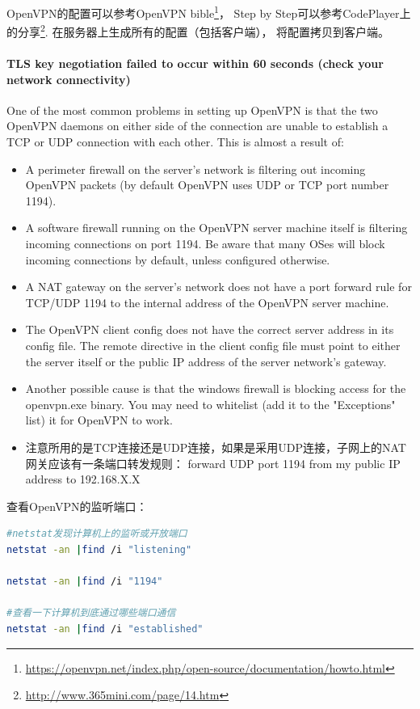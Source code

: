 \documentclass{book}
\begin{document}
OpenVPN的配置可以参考OpenVPN bible\footnote{\url{https://openvpn.net/index.php/open-source/documentation/howto.html}}，
Step by Step可以参考CodePlayer上的分享\footnote{\url{http://www.365mini.com/page/14.htm}}.
在服务器上生成所有的配置（包括客户端），
将配置拷贝到客户端。


\paragraph{TLS key negotiation failed to occur within 60 seconds (check your network connectivity)}

One of the most common problems in setting up OpenVPN is that the two OpenVPN daemons on either side of the connection are unable to establish a TCP or UDP connection with each other.
This is almost a result of:

\begin{itemize}
\item{A perimeter firewall on the server's network is filtering out incoming OpenVPN packets (by default OpenVPN uses UDP or TCP port number 1194).}
\item{A software firewall running on the OpenVPN server machine itself is filtering incoming connections on port 1194. Be aware that many OSes will block incoming connections by default, unless configured otherwise.}
\item{A NAT gateway on the server's network does not have a port forward rule for TCP/UDP 1194 to the internal address of the OpenVPN server machine.}
\item{The OpenVPN client config does not have the correct server address in its config file. The remote directive in the client config file must point to either the server itself or the public IP address of the server network's gateway.}
\item{Another possible cause is that the windows firewall is blocking access for the openvpn.exe binary. You may need to whitelist (add it to the "Exceptions" list) it for OpenVPN to work.}
\item{注意所用的是TCP连接还是UDP连接，如果是采用UDP连接，子网上的NAT网关应该有一条端口转发规则： forward UDP port 1194 from my public IP address to 192.168.X.X}
\end{itemize}

查看OpenVPN的监听端口：

\begin{lstlisting}[language=Bash]
#netstat发现计算机上的监听或开放端口
netstat -an |find /i "listening"

netstat -an |find /i "1194"

#查看一下计算机到底通过哪些端口通信
netstat -an |find /i "established"
\end{lstlisting}
\end{document}
